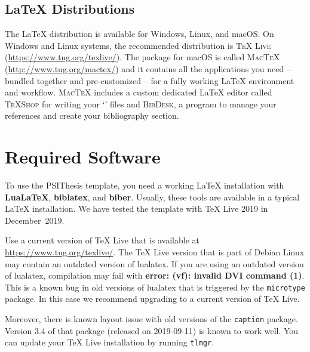\subsection{LaTeX Distributions}

The LaTeX distribution is available for Windows, Linux, and macOS\@.
On Windows and Linux systems, the recommended distribution is \textsc{TeX Live} (\url{https://www.tug.org/texlive/}).
The package for macOS is called \textsc{MacTeX} (\url{http://www.tug.org/mactex/}) and it contains all the applications you need -- bundled together and pre-customized -- for a fully working LaTeX environment and workflow. \textsc{MacTeX} includes a custom dedicated LaTeX editor called \textsc{TeXShop} for writing your `' files and \textsc{BibDesk}, a program to manage your references and create your bibliography section.



\section{Required Software}
\label{sec:requirements}

To use the PSIThesis template, you need a working LaTeX installation with \textbf{LuaLaTeX}, \textbf{biblatex}, and \textbf{biber}.%
Usually, these tools are available in a typical LaTeX installation. We have tested the template with TeX Live 2019 in December~2019.

Use a current version of TeX Live that is available at \url{https://www.tug.org/texlive/}. The TeX Live version that is part of Debian Linux may contain an outdated version of lualatex.
If you are using an outdated version of lualatex, compilation may fail with \textbf{error: (vf): invalid DVI command (1)}. This is a known bug in old versions of lualatex that is triggered by the \texttt{microtype} package. In this case we recommend upgrading to a current version of TeX Live.

Moreover, there is known layout issue with old versions of the \texttt{caption} package. Version 3.4 of that package (released on 2019-09-11) is known to work well. You can update your TeX Live installation by running \texttt{tlmgr}.

